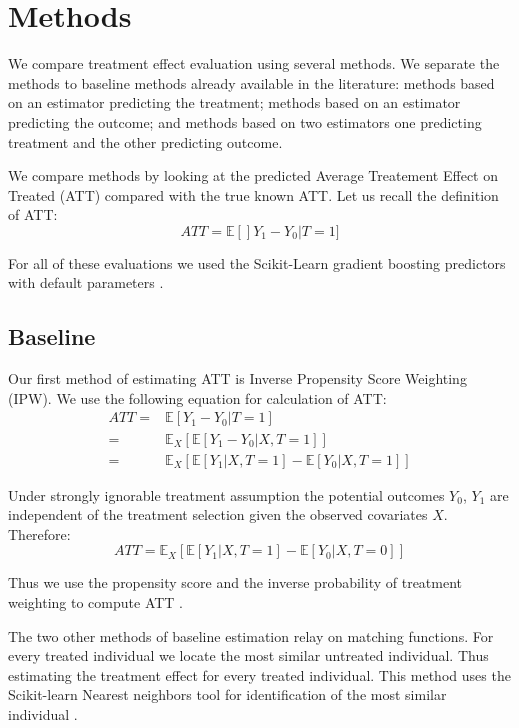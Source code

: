 \documentclass{article}
\begin{document}
\section{Methods}
We compare treatment effect evaluation using several methods. We separate the methods to baseline methods already available in the literature: methods based on an estimator predicting the treatment; methods based on an estimator predicting the outcome; and methods based on two estimators one predicting treatment and the other predicting outcome.

We compare methods by looking at the predicted Average Treatement Effect on Treated (ATT) compared with the true known ATT. Let us recall the definition of ATT:
\begin{equation*}
    ATT = \mathbb{E}[]Y_1 - Y_0 | T=1]
\end{equation*}

For all of these evaluations we used the Scikit-Learn gradient boosting predictors with default parameters \cite{scikit-learn}. 

\subsection{Baseline}
Our first method of estimating ATT is Inverse Propensity Score Weighting (IPW).
We use the following equation for calculation of ATT:
\begin{equation*}
    \begin{split}
        ATT = & \mathbb{E}[Y_1 - Y_0 | T=1] \\
        = & \mathbb{E}_X[\mathbb{E}[Y_1 - Y_0 | X, T=1]] \\
        = & \mathbb{E}_X[\mathbb{E}[Y_1 | X, T=1] - \mathbb{E}[Y_0 | X, T=1]]
    \end{split}
\end{equation*}

Under strongly ignorable treatment assumption the potential outcomes $Y_0$, $Y_1$ are independent of the treatment selection given the observed covariates $X$. Therefore:
\begin{equation*}
    ATT = \mathbb{E}_X[\mathbb{E}[Y_1|X, T=1] - \mathbb{E}[Y_0 | X, T=0]]
\end{equation*}

Thus we use the propensity score and the inverse probability of treatment weighting to compute ATT \cite{abdia2017propensity}. 

The two other methods of baseline estimation relay on matching functions. For every treated individual we locate the most similar untreated individual. Thus estimating the treatment effect for every treated individual. This method uses the Scikit-learn Nearest neighbors tool for identification of the most similar individual \cite{scikit-learn}. 
\end{document}
